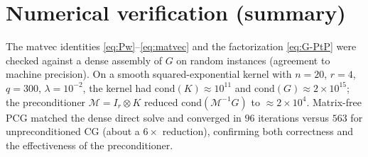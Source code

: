 \documentclass[12pt]{article}
\begin{document}
\section*{Numerical verification (summary)}

The matvec identities \eqref{eq:Pw}--\eqref{eq:matvec} and the factorization
\eqref{eq:G-PtP} were checked against a dense assembly of $G$ on random
instances (agreement to machine precision). On a smooth squared-exponential
kernel with $n=20$, $r=4$, $q=300$, $\lambda=10^{-2}$, the kernel had
$\mathrm{cond}(K)\approx10^{11}$ and $\mathrm{cond}(G)\approx2\times10^{15}$;
the preconditioner $\mathcal M=I_r\otimes K$ reduced
$\mathrm{cond}(\mathcal M^{-1}G)$ to $\approx2\times10^{4}$. Matrix-free PCG
matched the dense direct solve and converged in $96$ iterations versus $563$ for
unpreconditioned CG (about a $6\times$ reduction), confirming both correctness
and the effectiveness of the preconditioner.
\end{document}
